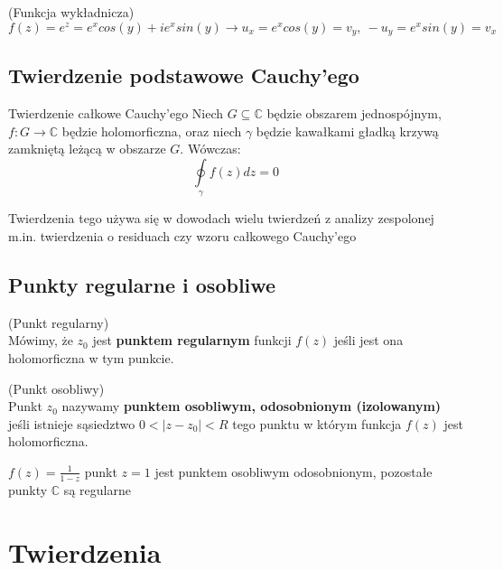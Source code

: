 \begin{przyk}{(Funkcja wykładnicza)}\\
$f(z)=e^z=e^x cos(y)+ie^x sin(y)\rightarrow u_x=e^x cos(y)=v_y,\ -u_y=e^x sin(y)=v_x$
\end{przyk}

\subsection{Twierdzenie podstawowe Cauchy'ego}

\begin{df}{Twierdzenie całkowe Cauchy'ego}
Niech $G\subseteq \mathbb{C}$ będzie obszarem jednospójnym, $f:G\rightarrow\mathbb{C}$ będzie holomorficzna, oraz niech $\gamma$ będzie kawałkami gładką krzywą zamkniętą leżącą w obszarze $G$. Wówczas:
$$\oint\limits_{\gamma}f(z)dz=0$$
\end{df}

\begin{uwg}
Twierdzenia tego używa się w dowodach wielu twierdzeń z analizy zespolonej m.in. twierdzenia o residuach czy wzoru całkowego Cauchy'ego
\end{uwg}

\subsection{Punkty regularne i osobliwe}

\begin{df}{(Punkt regularny)}\\
Mówimy, że $z_0$ jest \textbf{punktem regularnym} funkcji $f(z)$ jeśli jest ona holomorficzna w tym punkcie.
\end{df}

\begin{df}{(Punkt osobliwy)}\\
Punkt $z_0$ nazywamy \textbf{punktem osobliwym, odosobnionym (izolowanym)} jeśli istnieje sąsiedztwo $0<|z-z_0|<R$ tego punktu w którym funkcja $f(z)$ jest holomorficzna.
\end{df}

\begin{przyk}
$f(z)=\frac{1}{1-z}$ punkt $z=1$ jest punktem osobliwym odosobnionym, pozostałe punkty $\mathbb{C}$ są regularne
\end{przyk}

\section{Twierdzenia}

